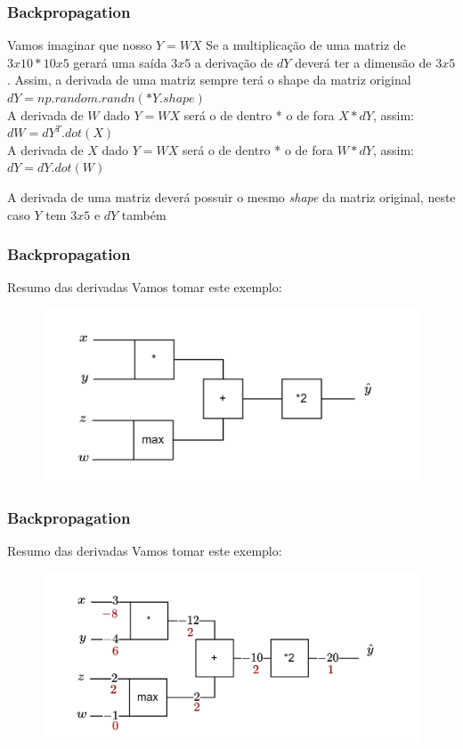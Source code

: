\documentclass{beamer}
\begin{document}
\begin{frame}
	\frametitle{Backpropagation}
	\begin{example}	
		Vamos imaginar que nosso $Y = WX$
		Se a multiplicação de uma matriz de $3x10 * 10x5$ gerará uma saída $3x5$ a derivação de $dY$ deverá ter a dimensão de $3x5$. Assim, a derivada de uma matriz sempre terá o shape da matriz original \\
		$dY = np.random.randn(*Y.shape)$ \\
		A derivada de $W$ dado $Y = WX$ será o de dentro * o de fora $X * dY$, assim: \\
		$dW = dY^T.dot(X)$\\
		A derivada de $X$ dado $Y = WX$ será o de dentro * o de fora $W * dY$, assim: \\
		$dY = dY.dot(W)$
		
		\alert{A derivada de uma matriz deverá possuir o mesmo \textit{shape} da matriz original, neste caso $Y$ tem $3x5$ e $dY$ também}
	\end{example}
\end{frame}
\begin{frame}
	\frametitle{Backpropagation}
	\begin{block}{Resumo das derivadas}
		Vamos tomar este exemplo:
		\begin{figure}
			\centering
			\includegraphics[width=0.7\linewidth]{figures/simple_circuit}
		\end{figure}
	\end{block}
\end{frame}
\begin{frame}
	\frametitle{Backpropagation}
	\begin{block}{Resumo das derivadas}
		Vamos tomar este exemplo:
		\begin{figure}
			\centering
			\includegraphics[width=0.7\linewidth]{figures/simple_circuit2}
		\end{figure}
	\end{block}
\end{frame}
\end{document}
